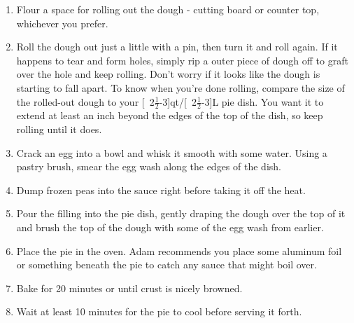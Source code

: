 \documentclass{book}
\begin{document}
\begin{recipe}
{\begin{enumerate}
				and pepper to taste. The sauce should ultimately taste a little
				too salty, as it doesn't need to stand on its own.
			\item Flour a space for rolling out the dough - cutting board or
				counter top, whichever you prefer.
			\item Roll the dough out just a little with a pin, then turn it and
				roll again. If it happens to tear and form holes, simply rip a
				outer piece of dough off to graft over the hole and keep
				rolling. Don't worry if it looks like the dough is starting to
				fall apart. To know when you're done rolling, compare the size
				of the rolled-out dough to your
				\unit[2$\frac{1}{2}$-3]{qt}/\unit[2$\frac{1}{2}$-3]{L} pie dish.
				You want it to extend at least an inch beyond the edges of the
				top of the dish, so keep rolling until it does.
			\item Crack an egg into a bowl and whisk it smooth with some water.
				Using a pastry brush, smear the egg wash along the edges of the
				dish.
			\item Dump frozen peas into the sauce right before taking it off the
				heat.
			\item Pour the filling into the pie dish, gently draping the dough
				over the top of it and brush the top of the dough with some of
				the egg wash from earlier.
			\item Place the pie in the oven. Adam recommends you place some
				aluminum foil or something beneath the pie to catch any sauce
				that might boil over.
			\item Bake for 20 minutes or until crust is nicely browned.
			\item Wait at least 10 minutes for the pie to cool before serving it
				forth.
		\end{enumerate}
	}
\end{recipe}
\end{document}
